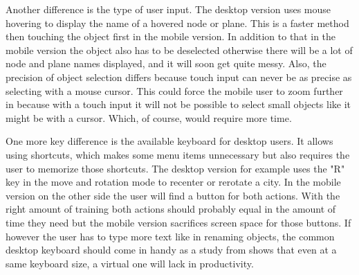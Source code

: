 Another difference is the type of user input.
The desktop version uses mouse hovering to display the name of a hovered \gls{node} or \gls{plane}.
This is a faster method then touching the object first in the mobile version.
In addition to that in the mobile version the object also has to be deselected otherwise there will be a lot of \gls{node} and \gls{plane} names displayed, and it will soon get quite messy.
Also, the precision of object selection differs because touch input can never be as precise as selecting with a mouse cursor.
This could force the mobile user to zoom further in because with a touch input it will not be possible to select small objects like it might be with a cursor.
Which, of course, would require more time.

One more key difference is the available keyboard for desktop users.
It allows using \glspl{shortcut}, which makes some menu items unnecessary but also requires the user to memorize those \glspl{shortcut}.
The desktop version for example uses the "R" key in the move and rotation mode to recenter or rerotate a \gls{city}.
In the mobile version on the other side the user will find a button for both actions.
With the right amount of training both actions should probably equal in the amount of time they need but the mobile version sacrifices screen space for those buttons.
If however the user has to type more text like in renaming objects, the common desktop keyboard should come in handy as a study from \cite{kim2014differences} shows that even at a same keyboard size, a virtual one will lack in productivity.
